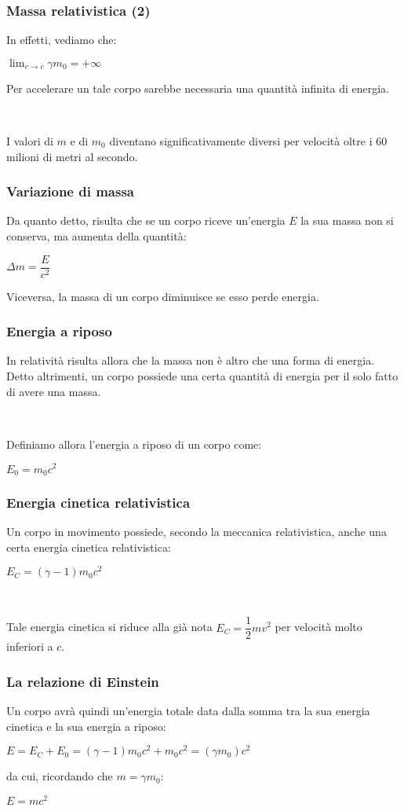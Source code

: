 \documentclass[]{beamer}
\theoremstyle{plain}
\begin{document}
\begin{frame}
\frametitle{Massa relativistica (2)}
In effetti, vediamo che:
\begin{center}
$ \displaystyle \lim_{v \to c} \gamma m_0 = + \infty $
\end{center}
Per accelerare un tale corpo sarebbe necessaria una quantità infinita di energia.\pause

~

I valori di $ m $ e di $ m_0 $ diventano significativamente diversi per velocità oltre i $ 60 $ milioni di metri al secondo.
\end{frame}

\begin{frame}
\frametitle{Variazione di massa}
Da quanto detto, risulta che se un corpo riceve un'energia $ E $ la sua massa non si conserva, ma aumenta della quantità:
\begin{center}
$ \Delta m = \dfrac{E}{c^2} $
\end{center}
Viceversa, la massa di un corpo diminuisce se esso perde energia.
\end{frame}


\begin{frame}
\frametitle{Energia a riposo}
In relatività risulta allora che la massa non è altro che una forma di energia. Detto altrimenti, un corpo possiede una certa quantità di energia per il solo fatto di avere una massa.\pause

~

Definiamo allora l'\alert{energia a riposo} di un corpo come:
\begin{center}
\colorbox{blue!30}{$ E_0 = m_0 c^2  $}
\end{center}
\end{frame}


\begin{frame}
\frametitle{Energia cinetica relativistica}
Un corpo in movimento possiede, secondo la meccanica relativistica, anche una certa \alert{energia cinetica relativistica}:
\begin{center}
\colorbox{blue!30}{$ E_C = (\gamma - 1) m_0 c^2 $}
\end{center}\pause

~

Tale energia cinetica si riduce alla già nota $ E_C = \dfrac{1}{2}mv^2 $ per velocità molto inferiori a $ c $.
\end{frame}


\begin{frame}
\frametitle{La relazione di Einstein}
Un corpo avrà quindi un'energia totale data dalla somma tra la sua energia cinetica e la sua energia a riposo:
\begin{center}
$ E = E_C + E_0 = (\gamma - 1) m_0 c^2 + m_0 c^2 = (\gamma m_0) c^2  $
\end{center}\pause
da cui, ricordando che $ m = \gamma m_0 $:
\begin{center}
\colorbox{blue!30}{$ E = m c^2  $}

~

\href{http://tinyurl.com/y44pmj7w}{}
\end{center}
\end{frame}
\end{document}
